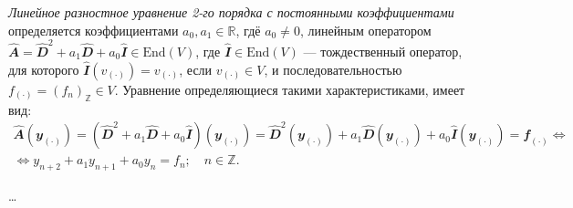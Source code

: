 
\textit{Линейное разностное уравнение 2-го порядка с постоянными коэффициентами} определяется коэффициентами $a_0, a_1 \in \mathbb{R}$, гдё $a_0 \not = 0$, линейным оператором $\hat{\mathbfit{A}} = \hat{\mathbfit{D}}^2 + a_1 \hat{\mathbfit{D}} + a_0 \hat{\mathbfit{I}} \in \mathrm{End}(V)$, где $\hat{\mathbfit{I}} \in \mathrm{End}(V)$ --- тождественный оператор, для которого $\hat{\mathbfit{I}}(v_{(\cdot)}) = v_{(\cdot)}$, если $v_{(\cdot)} \in V$, и последовательностью $f_{(\cdot)} = (f_n)_{\mathbb{Z}} \in V$. Уравнение определяющиеся такими характеристиками, имеет вид: 
\begin{gather*}
	\hat{\mathbfit{A}}(\mathbfit{y}_{(\cdot)}) = \left(\hat{\mathbfit{D}}^2 + a_1 \hat{\mathbfit{D}} + a_0 \hat{\mathbfit{I}}\right)(\mathbfit{y}_{(\cdot)}) = \hat{\mathbfit{D}}^2(\mathbfit{y}_{(\cdot)}) + a_1 \hat{\mathbfit{D}}(\mathbfit{y}_{(\cdot)}) + a_0 \hat{\mathbfit{I}}(\mathbfit{y}_{(\cdot)}) = \mathbfit{f}_{(\cdot)} \Leftrightarrow \\
	\Leftrightarrow y_{n + 2} + a_1 y_{n + 1} + a_0 y_n = f_n; \quad n \in \mathbb{Z}. 
\end{gather*} 

\dots 

